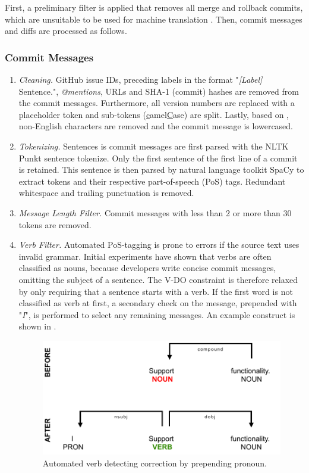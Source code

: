 First, a preliminary filter is applied that removes all merge and rollback commits, which are unsuitable to be used for machine translation \cite{jiang_automatically_2017}. Then, commit messages and diffs are processed as follows.

\subsubsection{Commit Messages}

\begin{enumerate}
\item \textit{Cleaning.} GitHub issue IDs, preceding labels in the format "\textit{[Label]} Sentence.", \textit{@mentions}, URLs and SHA-1 (commit) hashes are removed from the commit messages. Furthermore, all version numbers are replaced with a placeholder token and sub-tokens (\underline{c}amel\underline{C}ase) are split. Lastly, based on \citet{liu_generating_2019}, non-English characters are removed and the commit message is lowercased.

\item \textit{Tokenizing.} Sentences is commit messages are first parsed with the NLTK Punkt sentence tokenize. Only the first sentence of the first line of a commit is retained. This sentence is then parsed by natural language toolkit SpaCy to extract tokens and their respective part-of-speech (PoS) tags. Redundant whitespace and trailing punctuation is removed.

\item \textit{Message Length Filter.} Commit messages with less than 2 or more than 30 tokens are removed.

\item \textit{Verb Filter.} Automated PoS-tagging is prone to errors if the source text uses invalid grammar. Initial experiments have shown that verbs are often classified as nouns, because developers write concise commit messages, omitting the subject of a sentence. The V-DO constraint is therefore relaxed by only requiring that a sentence starts with a verb. If the first word is not classified as verb at first, a secondary check on the message, prepended with "\textit{I}", is performed to select any remaining messages. An example construct is shown in .

\begin{figure}
    \centering
    \includegraphics[width=.75\linewidth]{figs/verbs_wrong.pdf}
    \caption{Automated verb detecting correction by prepending pronoun.}
    \label{fig:verb_detection_error}
\end{figure}
\end{enumerate}

